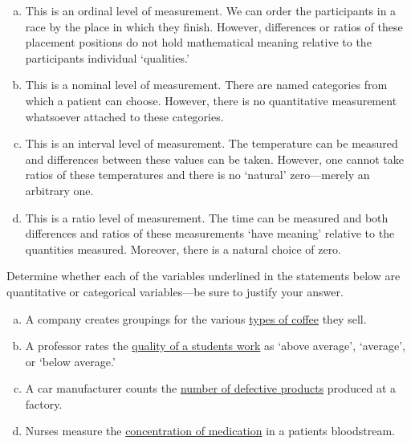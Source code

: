 \documentclass[11pt,letterpaper]{article}
\begin{document}
\sol 
\begin{enumerate}[(a)]
\item This is an ordinal level of measurement. We can order the participants in a race by the place in which they finish. However, differences or ratios of these placement positions do not hold mathematical meaning relative to the participants individual `qualities.' \pspace

\item This is a nominal level of measurement. There are named categories from which a patient can choose. However, there is no quantitative measurement whatsoever attached to these categories. \pspace

\item This is an interval level of measurement. The temperature can be measured and differences between these values can be taken. However, one cannot take ratios of these temperatures and there is no `natural' zero---merely an arbitrary one. \pspace

\item This is a ratio level of measurement. The time can be measured and both differences and ratios of these measurements `have meaning' relative to the quantities measured. Moreover, there is a natural choice of zero. 
\end{enumerate}



\newpage



 Determine whether each of the variables underlined in the statements below are quantitative or categorical variables---be sure to justify your answer. 
	\begin{enumerate}[(a)]
	\item A company creates groupings for the various \underline{types of coffee} they sell. 
	\item A professor rates the \underline{quality of a students work} as `above average', `average', or `below average.' 
	\item A car manufacturer counts the \underline{number of defective products} produced at a factory.  
	\item Nurses measure the \underline{concentration of medication} in a patients bloodstream. 
	\end{enumerate} \pspace
\end{document}
